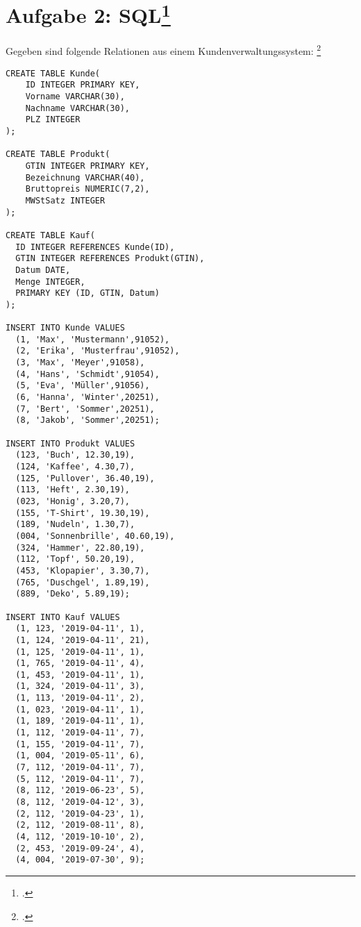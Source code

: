 \documentclass{lehramt-informatik-aufgabe}
\begin{document}

\section{Aufgabe 2: SQL\footcite{db:pu:3}}
Gegeben sind folgende Relationen aus einem Kundenverwaltungssystem:
\footcite[Thema 1 Teilaufgabe 1 Aufgabe 4]{examen:46116:2018:09}

\begin{liRmodell}
\end{liRmodell}

\begin{verbatim}
CREATE TABLE Kunde(
	ID INTEGER PRIMARY KEY,
	Vorname VARCHAR(30),
	Nachname VARCHAR(30),
	PLZ INTEGER
);

CREATE TABLE Produkt(
	GTIN INTEGER PRIMARY KEY,
	Bezeichnung VARCHAR(40),
	Bruttopreis NUMERIC(7,2),
	MWStSatz INTEGER
);

CREATE TABLE Kauf(
  ID INTEGER REFERENCES Kunde(ID),
  GTIN INTEGER REFERENCES Produkt(GTIN),
  Datum DATE,
  Menge INTEGER,
  PRIMARY KEY (ID, GTIN, Datum)
);

INSERT INTO Kunde VALUES
  (1, 'Max', 'Mustermann',91052),
  (2, 'Erika', 'Musterfrau',91052),
  (3, 'Max', 'Meyer',91058),
  (4, 'Hans', 'Schmidt',91054),
  (5, 'Eva', 'Müller',91056),
  (6, 'Hanna', 'Winter',20251),
  (7, 'Bert', 'Sommer',20251),
  (8, 'Jakob', 'Sommer',20251);

INSERT INTO Produkt VALUES
  (123, 'Buch', 12.30,19),
  (124, 'Kaffee', 4.30,7),
  (125, 'Pullover', 36.40,19),
  (113, 'Heft', 2.30,19),
  (023, 'Honig', 3.20,7),
  (155, 'T-Shirt', 19.30,19),
  (189, 'Nudeln', 1.30,7),
  (004, 'Sonnenbrille', 40.60,19),
  (324, 'Hammer', 22.80,19),
  (112, 'Topf', 50.20,19),
  (453, 'Klopapier', 3.30,7),
  (765, 'Duschgel', 1.89,19),
  (889, 'Deko', 5.89,19);

INSERT INTO Kauf VALUES
  (1, 123, '2019-04-11', 1),
  (1, 124, '2019-04-11', 21),
  (1, 125, '2019-04-11', 1),
  (1, 765, '2019-04-11', 4),
  (1, 453, '2019-04-11', 1),
  (1, 324, '2019-04-11', 3),
  (1, 113, '2019-04-11', 2),
  (1, 023, '2019-04-11', 1),
  (1, 189, '2019-04-11', 1),
  (1, 112, '2019-04-11', 7),
  (1, 155, '2019-04-11', 7),
  (1, 004, '2019-05-11', 6),
  (7, 112, '2019-04-11', 7),
  (5, 112, '2019-04-11', 7),
  (8, 112, '2019-06-23', 5),
  (8, 112, '2019-04-12', 3),
  (2, 112, '2019-04-23', 1),
  (2, 112, '2019-08-11', 8),
  (4, 112, '2019-10-10', 2),
  (2, 453, '2019-09-24', 4),
  (4, 004, '2019-07-30', 9);
\end{verbatim}
\end{document}

